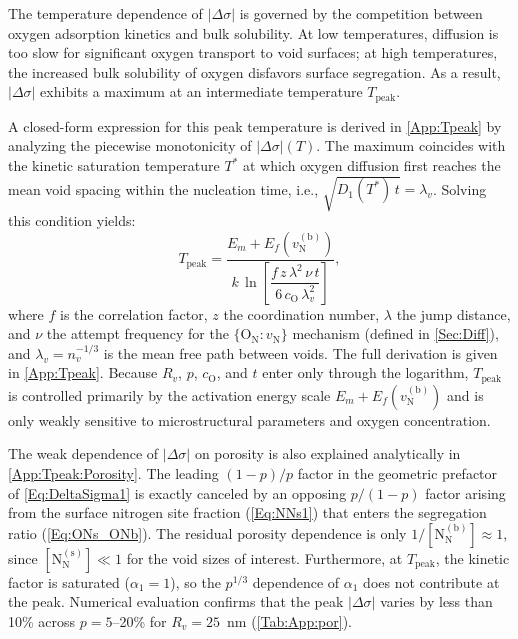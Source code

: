 \documentclass[preprint,12pt,sort&compress]{elsarticle}
\newcommand{\?}{\stackrel{?}{=}}
\begin{document}
The temperature dependence of $|\Delta\sigma|$ is governed by the competition between oxygen adsorption kinetics and bulk solubility. At low temperatures, diffusion is too slow for significant oxygen transport to void surfaces; at high temperatures, the increased bulk solubility of oxygen disfavors surface segregation. As a result, $|\Delta\sigma|$ exhibits a maximum at an intermediate temperature $T_\text{peak}$.

A closed-form expression for this peak temperature is derived in \ref{App:Tpeak} by analyzing the piecewise monotonicity of $|\Delta\sigma|(T)$. The maximum coincides with the kinetic saturation temperature $T^*$ at which oxygen diffusion first reaches the mean void spacing within the nucleation time, i.e., $\sqrt{D_1(T^*)\,t} = \lambda_v$. Solving this condition yields:
\begin{equation}
T_\text{peak} = \frac{E_m + E_f(v_\text{N}^{(\text{b})})}{k\,\ln\!\left[\dfrac{f\,z\,\lambda^2\,\nu\,t}{6\,c_\text{O}\,\lambda_v^2}\right]},
\label{Eq:TpeakMain}
\end{equation}
where $f$ is the correlation factor, $z$ the coordination number, $\lambda$ the jump distance, and $\nu$ the attempt frequency for the $\{\text{O}_\text{N} \! : \! v_\text{N}\}$ mechanism (defined in \cref{Sec:Diff}), and $\lambda_v = n_v^{-1/3}$ is the mean free path between voids. The full derivation is given in \ref{App:Tpeak}. Because $R_v$, $p$, $c_\text{O}$, and $t$ enter only through the logarithm, $T_\text{peak}$ is controlled primarily by the activation energy scale $E_m + E_f(v_\text{N}^{(\text{b})})$ and is only weakly sensitive to microstructural parameters and oxygen concentration.

The weak dependence of $|\Delta\sigma|$ on porosity is also explained analytically in \ref{App:Tpeak:Porosity}. The leading $(1-p)/p$ factor in the geometric prefactor of \cref{Eq:DeltaSigma1} is exactly canceled by an opposing $p/(1-p)$ factor arising from the surface nitrogen site fraction (\cref{Eq:NNs1}) that enters the segregation ratio (\cref{Eq:ONs_ONb}). The residual porosity dependence is only $1/[\text{N}_\text{N}^{(\text{b})}] \approx 1$, since $[\text{N}_\text{N}^{(\text{s})}] \ll 1$ for the void sizes of interest. Furthermore, at $T_\text{peak}$, the kinetic factor is saturated ($\alpha_1 = 1$), so the $p^{1/3}$ dependence of $\alpha_1$ does not contribute at the peak. Numerical evaluation confirms that the peak $|\Delta\sigma|$ varies by less than 10\% across $p = 5$--20\% for $R_v = 25$~nm (\cref{Tab:App:por}).
\end{document}
